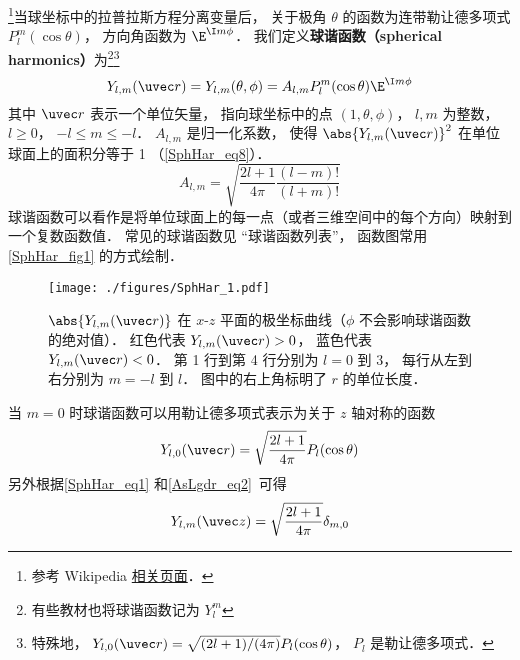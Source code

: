 

\footnote{参考 Wikipedia \href{https://en.wikipedia.org/wiki/Spherical_harmonics}{相关页面}．}当球坐标中的拉普拉斯方程分离变量后， 关于极角 $\theta$ 的函数为连带勒让德多项式 $P_l^m(\cos\theta)$， 方向角函数为 $\E^{\I m\phi}$． 我们定义\textbf{球谐函数（spherical harmonics）}为\footnote{有些教材也将球谐函数记为 $Y_l^m$}\footnote{特殊地， $Y_{l,0}(\uvec r) = \sqrt{(2l + 1)/(4\pi)}P_l(\cos\theta)$， $P_l$ 是勒让德多项式．}
\begin{equation}\label{SphHar_eq1}
Y_{l, m} (\uvec r) = Y_{l, m}(\theta, \phi) = A_{l,m} P_l^m(\cos \theta) \E^{\I m\phi}
\end{equation}
其中 $\uvec r$ 表示一个单位矢量， 指向球坐标中的点 $(1, \theta, \phi)$， $l, m$ 为整数， $l \geqslant 0$， $-l \leqslant m \leqslant -l$． $A_{l,m}$ 是归一化系数， 使得 $\abs{Y_{l, m} (\uvec r)}^2$ 在单位球面上的面积分等于 1 （\autoref{SphHar_eq8}）．
\begin{equation}\label{SphHar_eq2}
A_{l,m} =  \sqrt{\frac{2l + 1}{4\pi }\frac{(l - m)!}{(l + m)!}}
\end{equation}
球谐函数可以看作是将单位球面上的每一点（或者三维空间中的每个方向）映射到一个复数函数值． 常见的球谐函数见 “球谐函数列表”， 函数图常用\autoref{SphHar_fig1} 的方式绘制．

\begin{figure}[ht]
\centering
\texttt{[image: ./figures/SphHar\_1.pdf]}
\caption{$\abs{Y_{l,m}(\uvec r)}$ 在 $x$-$z$ 平面的极坐标曲线（$\phi$ 不会影响球谐函数的绝对值）． 红色代表 $Y_{l,m}(\uvec r) > 0$， 蓝色代表 $Y_{l,m}(\uvec r) < 0$． 第 1 行到第 4 行分别为 $l = 0$ 到 $3$， 每行从左到右分别为 $m = -l$ 到 $l$． 图中的右上角标明了 $r$ 的单位长度．} \label{SphHar_fig1}
\end{figure}

当 $m = 0$ 时球谐函数可以用勒让德多项式表示为关于 $z$ 轴对称的函数
\begin{equation}\label{SphHar_eq11}
Y_{l,0}(\uvec r) = \sqrt{\frac{2l+1}{4\pi}} P_l(\cos\theta)
\end{equation}
另外根据\autoref{SphHar_eq1} 和\autoref{AsLgdr_eq2}~可得
\begin{equation}
Y_{l,m}(\uvec z) = \sqrt{\frac{2l+1}{4\pi}} \delta_{m,0}
\end{equation}

